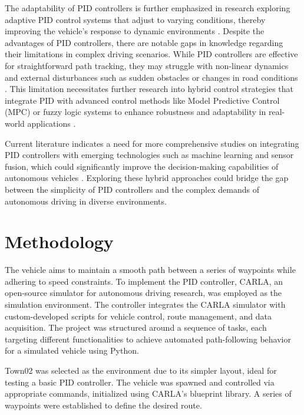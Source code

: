 \documentclass[conference]{IEEEtran}
\begin{document}
The adaptability of PID controllers is further emphasized in research exploring adaptive PID control systems that adjust to varying conditions, thereby improving the vehicle's response to dynamic environments \cite{10.5772/51314}. Despite the advantages of PID controllers, there are notable gaps in knowledge regarding their limitations in complex driving scenarios. While PID controllers are effective for straightforward path tracking, they may struggle with non-linear dynamics and external disturbances such as sudden obstacles or changes in road conditions \cite{10.25165/j.ijabe.20241701.7296}. This limitation necessitates further research into hybrid control strategies that integrate PID with advanced control methods like Model Predictive Control (MPC) or fuzzy logic systems to enhance robustness and adaptability in real-world applications \cite{10.2478/auseme-2020-0003,10.1088/1742-6596/2478/6/062003}.

Current literature indicates a need for more comprehensive studies on integrating PID controllers with emerging technologies such as machine learning and sensor fusion, which could significantly improve the decision-making capabilities of autonomous vehicles \cite{10.1109/tiv.2016.2578706}. Exploring these hybrid approaches could bridge the gap between the simplicity of PID controllers and the complex demands of autonomous driving in diverse environments.

\section{Methodology}

The vehicle aims to maintain a smooth path between a series of waypoints while adhering to speed constraints. To implement the PID controller, CARLA, an open-source simulator for autonomous driving research, was employed as the simulation environment. The controller integrates the CARLA simulator with custom-developed scripts for vehicle control, route management, and data acquisition. The project was structured around a sequence of tasks, each targeting different functionalities to achieve automated path-following behavior for a simulated vehicle using Python.

Town02 was selected as the environment due to its simpler layout, ideal for testing a basic PID controller. The vehicle was spawned and controlled via appropriate commands, initialized using CARLA's blueprint library. A series of waypoints were established to define the desired route.
\end{document}

